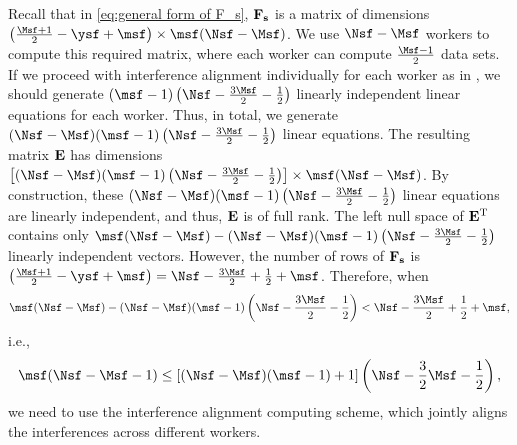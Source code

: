 \documentclass[conference,letterpaper]{IEEEtran}
\begin{document}
Recall that in \eqref{eq:general form of F_s}, ${\bf F}_{\bf s}$ is a matrix of dimensions $\left( \frac{\Msf + 1}{2} - \ysf + \msf \right) \times \msf(\Nsf - \Msf)$. We use $\Nsf-\Msf$ workers to compute this required matrix, where each worker can compute $\frac{\Msf - 1}{2}$ data sets. If we proceed with interference alignment individually for each worker as in \label{ex:scheme 3 example}, we should generate $(\msf-1)\left(\Nsf - \frac{3\Msf}{2} - \frac{1}{2}\right)$ linearly independent linear equations for each worker. Thus, in total, we generate $(\Nsf-\Msf)(\msf-1)\left(\Nsf - \frac{3\Msf}{2} - \frac{1}{2}\right)$ linear equations. The resulting matrix ${\bf E}$ has dimensions $ \left[ (\Nsf-\Msf)(\msf-1)\left(\Nsf - \frac{3\Msf}{2} - \frac{1}{2}\right) \right] \times \msf(\Nsf-\Msf)$. By construction, these $(\Nsf-\Msf)(\msf-1)\left(\Nsf - \frac{3\Msf}{2} - \frac{1}{2}\right)$ linear equations are linearly independent, and thus, ${\bf E}$ is of full rank. The left null space of ${\bf E}^{\text{\rm T}}$ contains only $\msf(\Nsf-\Msf) - (\Nsf-\Msf)(\msf-1)\left(\Nsf - \frac{3\Msf}{2} - \frac{1}{2}\right)$ linearly independent vectors. However, the number of rows of ${\bf F}_{\bf s}$ is $\left( \frac{\Msf + 1}{2} - \ysf + \msf \right) = \Nsf - \frac{3\Msf}{2} + \frac{1}{2} + \msf$. Therefore, when 
$$ \msf(\Nsf-\Msf) - (\Nsf-\Msf)(\msf-1)\left(\Nsf - \frac{3\Msf}{2} - \frac{1}{2}\right) < \Nsf - \frac{3\Msf}{2} + \frac{1}{2} + \msf, $$
i.e.,
$$ \msf(\Nsf - \Msf - 1) \leq \left[ (\Nsf - \Msf)(\msf - 1) + 1 \right] \left( \Nsf - \frac{3}{2} \Msf - \frac{1}{2} \right), $$
we need to use the interference alignment computing scheme, which jointly aligns the interferences across different workers.




\end{document}
